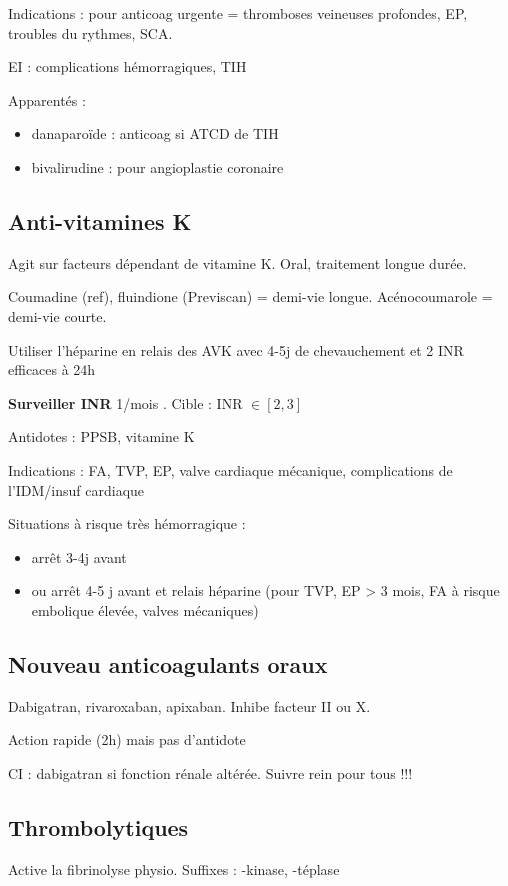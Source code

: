 Indications : pour anticoag urgente = thromboses veineuses profondes, EP,
troubles du rythmes, SCA.

EI : complications hémorragiques, \gls{TIH}

Apparentés :
\begin{itemize}
  \item danaparoïde : anticoag si ATCD de TIH
  \item bivalirudine : pour angioplastie coronaire
\end{itemize}

\subsection{Anti-vitamines K}
Agit sur facteurs dépendant de vitamine K. Oral, traitement longue durée.

Coumadine (ref), fluindione (Previscan) = demi-vie longue. Acénocoumarole = demi-vie courte.

Utiliser l'héparine en relais des AVK avec 4-5j de chevauchement et 2 INR
efficaces à 24h

\textbf{Surveiller INR}  1/mois \danger. Cible : INR $\in [2,3]$

Antidotes : PPSB, vitamine K

Indications : FA, TVP, EP, valve cardiaque mécanique,
complications de l'IDM/insuf cardiaque

Situations à risque très hémorragique :
\begin{itemize}
  \item arrêt 3-4j avant
  \item ou arrêt 4-5 j avant et relais héparine (pour TVP, EP > 3 mois, FA
    à risque embolique élevée, valves mécaniques)
\end{itemize}

\subsection{Nouveau anticoagulants oraux}
Dabigatran, rivaroxaban, apixaban. Inhibe facteur II ou X.

Action rapide (2h) mais pas d'antidote

CI : dabigatran si fonction rénale altérée. Suivre rein pour tous !!!

\subsection{Thrombolytiques}
Active la fibrinolyse physio. Suffixes : -kinase, -téplase

